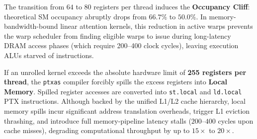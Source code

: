\begin{table}[t]
\centering
\small
\caption[Register Allocation vs Theoretical SM Occupancy]{\textbf{Register File Allocation vs. Theoretical SM Occupancy on NVIDIA Ada Lovelace (SM 8.9).} Hardware limits: 65,536 physical 32-bit registers per SM; maximum 48 active warps (1,536 threads); maximum 255 registers per individual thread.}
\label{tab:register_occupancy_breakdown}
\setlength{\tabcolsep}{6pt}
\renewcommand{\arraystretch}{1.12}
\end{table}

The transition from $64$ to $80$ registers per thread induces the \textbf{Occupancy Cliff}: theoretical SM occupancy abruptly drops from $66.7\%$ to $50.0\%$. In memory-bandwidth-bound linear attention kernels, this reduction in active warps prevents the warp scheduler from finding eligible warps to issue during long-latency DRAM access phases (which require 200--400 clock cycles), leaving execution ALUs starved of instructions.

If an unrolled kernel exceeds the absolute hardware limit of \textbf{255 registers per thread}, the \texttt{ptxas} compiler forcibly spills the excess registers into \textbf{Local Memory}. Spilled register accesses are converted into \texttt{st.local} and \texttt{ld.local} PTX instructions. Although backed by the unified L1/L2 cache hierarchy, local memory spills incur significant address translation overheads, trigger L1 eviction thrashing, and introduce full memory-pipeline latency stalls ($200\text{--}400$ cycles upon cache misses), degrading computational throughput by up to $15\times$ to $20\times$. 

